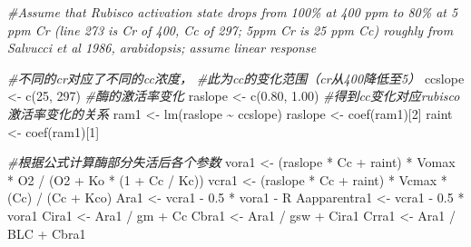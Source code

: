 \documentclass[
]{krantz}
\makeatletter
\newenvironment{Shaded}{\begin{snugshade}}{\end{snugshade}}
\newcommand{\CommentTok}[1]{\textcolor[rgb]{0.56,0.35,0.01}{\textit{#1}}}
\newcommand{\DecValTok}[1]{\textcolor[rgb]{0.00,0.00,0.81}{#1}}
\newcommand{\FloatTok}[1]{\textcolor[rgb]{0.00,0.00,0.81}{#1}}
\newcommand{\FunctionTok}[1]{\textcolor[rgb]{0.00,0.00,0.00}{#1}}
\newcommand{\NormalTok}[1]{#1}
\newcommand{\OtherTok}[1]{\textcolor[rgb]{0.56,0.35,0.01}{#1}}
\newcommand{\SpecialCharTok}[1]{\textcolor[rgb]{0.00,0.00,0.00}{#1}}
\newenvironment{kframe}{%
\medskip{}
\setlength{\fboxsep}{.8em}
 \def\at@end@of@kframe{}%
 \ifinner\ifhmode%
  \def\at@end@of@kframe{\end{minipage}}%
  \begin{minipage}{\columnwidth}%
 \fi\fi%
 \def\FrameCommand##1{\hskip\@totalleftmargin \hskip-\fboxsep
 \colorbox{shadecolor}{##1}\hskip-\fboxsep
     \hskip-\linewidth \hskip-\@totalleftmargin \hskip\columnwidth}%
 \MakeFramed {\advance\hsize-\width
   \@totalleftmargin\z@ \linewidth\hsize
   \@setminipage}}%
 {\par\unskip\endMakeFramed%
 \at@end@of@kframe}
\renewenvironment{Shaded}{\begin{kframe}}{\end{kframe}}
\makeatother
\begin{document}
\begin{Shaded}
\begin{Highlighting}[]
\CommentTok{\#Assume that Rubisco activation state drops from 100\% at 400 ppm to 80\% at 5 ppm Cr (line 273 is Cr of 400, Cc of 297; 5ppm Cr is 25 ppm Cc) roughly from Salvucci et al 1986, arabidopsis; assume linear response}

\CommentTok{\#不同的cr对应了不同的cc浓度，}
\CommentTok{\#此为cc的变化范围（cr从400降低至5）}
\NormalTok{ccslope }\OtherTok{\textless{}{-}} \FunctionTok{c}\NormalTok{(}\DecValTok{25}\NormalTok{, }\DecValTok{297}\NormalTok{)}
\CommentTok{\#酶的激活率变化}
\NormalTok{raslope }\OtherTok{\textless{}{-}} \FunctionTok{c}\NormalTok{(}\FloatTok{0.80}\NormalTok{, }\FloatTok{1.00}\NormalTok{)}
\CommentTok{\#得到cc变化对应rubisco激活率变化的关系}
\NormalTok{ram1 }\OtherTok{\textless{}{-}} \FunctionTok{lm}\NormalTok{(raslope }\SpecialCharTok{\textasciitilde{}}\NormalTok{ ccslope)}
\NormalTok{raslope }\OtherTok{\textless{}{-}} \FunctionTok{coef}\NormalTok{(ram1)[}\DecValTok{2}\NormalTok{]}
\NormalTok{raint }\OtherTok{\textless{}{-}} \FunctionTok{coef}\NormalTok{(ram1)[}\DecValTok{1}\NormalTok{]}

\CommentTok{\#根据公式计算酶部分失活后各个参数}
\NormalTok{vora1 }\OtherTok{\textless{}{-}}\NormalTok{ (raslope }\SpecialCharTok{*}\NormalTok{ Cc }\SpecialCharTok{+}\NormalTok{ raint) }\SpecialCharTok{*}\NormalTok{ Vomax }\SpecialCharTok{*}\NormalTok{ O2 }\SpecialCharTok{/}\NormalTok{ (O2 }\SpecialCharTok{+}\NormalTok{ Ko }\SpecialCharTok{*}\NormalTok{ (}\DecValTok{1} \SpecialCharTok{+}\NormalTok{ Cc }\SpecialCharTok{/}\NormalTok{ Kc))}
\NormalTok{vcra1 }\OtherTok{\textless{}{-}}\NormalTok{ (raslope }\SpecialCharTok{*}\NormalTok{ Cc }\SpecialCharTok{+}\NormalTok{ raint) }\SpecialCharTok{*}\NormalTok{ Vcmax }\SpecialCharTok{*}\NormalTok{ (Cc) }\SpecialCharTok{/}\NormalTok{ (Cc }\SpecialCharTok{+}\NormalTok{ Kco)}
\NormalTok{Ara1 }\OtherTok{\textless{}{-}}\NormalTok{ vcra1 }\SpecialCharTok{{-}} \FloatTok{0.5} \SpecialCharTok{*}\NormalTok{ vora1 }\SpecialCharTok{{-}}\NormalTok{ R}
\NormalTok{Aapparentra1 }\OtherTok{\textless{}{-}}\NormalTok{ vcra1 }\SpecialCharTok{{-}} \FloatTok{0.5} \SpecialCharTok{*}\NormalTok{ vora1}
\NormalTok{Cira1 }\OtherTok{\textless{}{-}}\NormalTok{ Ara1 }\SpecialCharTok{/}\NormalTok{ gm }\SpecialCharTok{+}\NormalTok{ Cc}
\NormalTok{Cbra1 }\OtherTok{\textless{}{-}}\NormalTok{ Ara1 }\SpecialCharTok{/}\NormalTok{ gsw }\SpecialCharTok{+}\NormalTok{ Cira1}
\NormalTok{Crra1 }\OtherTok{\textless{}{-}}\NormalTok{ Ara1 }\SpecialCharTok{/}\NormalTok{ BLC }\SpecialCharTok{+}\NormalTok{ Cbra1}


\end{Highlighting}
\end{Shaded}
\end{document}
